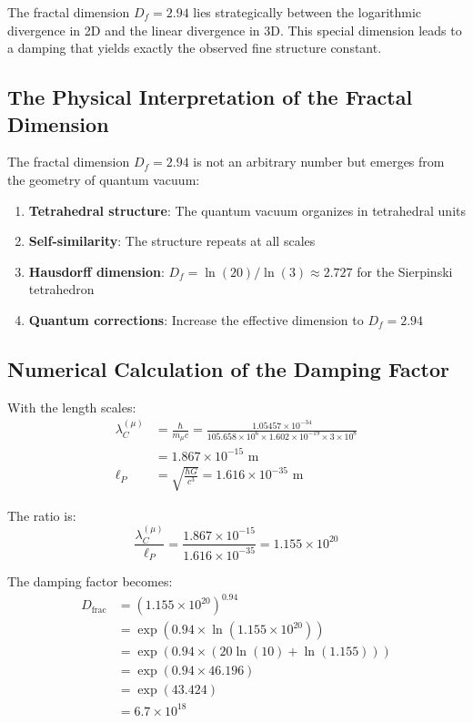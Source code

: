 \documentclass[12pt,a4paper]{article}
\theoremstyle{definition}
\begin{document}
	The fractal dimension $D_f = 2.94$ lies strategically between the logarithmic divergence in 2D and the linear divergence in 3D. This special dimension leads to a damping that yields exactly the observed fine structure constant.
	
	\subsection{The Physical Interpretation of the Fractal Dimension}
	
	The fractal dimension $D_f = 2.94$ is not an arbitrary number but emerges from the geometry of quantum vacuum:
	
	\begin{enumerate}
		\item \textbf{Tetrahedral structure}: The quantum vacuum organizes in tetrahedral units
		\item \textbf{Self-similarity}: The structure repeats at all scales
		\item \textbf{Hausdorff dimension}: $D_f = \ln(20)/\ln(3) \approx 2.727$ for the Sierpinski tetrahedron
		\item \textbf{Quantum corrections}: Increase the effective dimension to $D_f = 2.94$
	\end{enumerate}
	
	\subsection{Numerical Calculation of the Damping Factor}
	
	With the length scales:
	\begin{align}
		\lambda_C^{(\mu)} &= \frac{\hbar}{m_\mu c} = \frac{1.05457 \times 10^{-34}}{105.658 \times 10^6 \times 1.602 \times 10^{-19} \times 3 \times 10^8}\\
		&= 1.867 \times 10^{-15} \text{ m}\\
		\ell_P &= \sqrt{\frac{\hbar G}{c^3}} = 1.616 \times 10^{-35} \text{ m}
	\end{align}
	
	The ratio is:
	\begin{equation}
		\frac{\lambda_C^{(\mu)}}{\ell_P} = \frac{1.867 \times 10^{-15}}{1.616 \times 10^{-35}} = 1.155 \times 10^{20}
	\end{equation}
	
	The damping factor becomes:
	\begin{align}
		D_{\text{frac}} &= \left(1.155 \times 10^{20}\right)^{0.94}\\
		&= \exp(0.94 \times \ln(1.155 \times 10^{20}))\\
		&= \exp(0.94 \times (20 \ln(10) + \ln(1.155)))\\
		&= \exp(0.94 \times 46.196)\\
		&= \exp(43.424)\\
		&= 6.7 \times 10^{18}
	\end{align}
	
\end{document}
